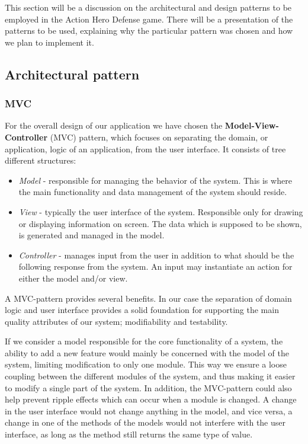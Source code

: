 This section will be a discussion on the architectural and design patterns to be employed in the Action Hero Defense game. There will be a presentation of the patterns to be used, explaining why the particular pattern was chosen and how we plan to implement it.

\subsection{Architectural pattern}
\subsubsection{MVC}
For the overall design of our application we have chosen the \textbf{Model-View-Controller} (MVC) pattern, which focuses on separating the domain, or application, logic of an application, from the user interface. It consists of tree different structures\cite{wiki:mvc}:
\begin{itemize}
\item \emph{Model} - responsible for managing the behavior of the system. This is where the main functionality and data management of the system should reside.
\item \emph{View} - typically the user interface of the system. Responsible only for drawing or displaying information on screen. The data which is supposed to be shown, is generated and managed in the model.
\item \emph{Controller} - manages input from the user in addition to what should be the following response from the system. An input may instantiate an action for either the model and/or view. 
\end{itemize}

 
A MVC-pattern provides several benefits. In our case the separation of domain logic and user interface provides a solid foundation for supporting the main quality attributes of our system; modifiability and testability. 

If we consider a model responsible for the core functionality of a system, the ability to add a new feature would mainly be concerned with the model of the system, limiting modification to only one module. This way we ensure a loose coupling between the different modules of the system, and thus making it easier to modify a single part of the system. In addition, the MVC-pattern could also help prevent ripple effects which can occur when a module is changed. A change in the user interface would not change anything in the model, and vice versa, a change in one of the methods of the models would not interfere with the user interface, as long as the method still returns the same type of value. 


